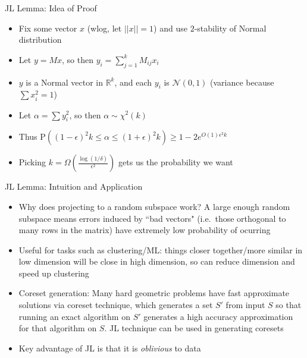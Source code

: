 \begin{frame}{JL Lemma: Idea of Proof}
\protect\hypertarget{jl-lemma-idea-of-proof}{}
\begin{itemize}
\tightlist
\item
  Fix some vector \(x\) (wlog, let \(||x||=1\)) and use \(2\)-stability
  of Normal distribution
\item
  Let \(y = Mx\), so then \(y_i = \sum_{j=1}^k M_{ij} x_{i}\)
\item
  \(y\) is a Normal vector in \(\mathbb{R}^k\), and each \(y_i\) is
  \(\mathcal{N}(0,1)\) (variance because \(\sum x_i^2 = 1\))
\item
  Let \(\alpha = \sum y_i^2\), so then \(\alpha \sim \chi^2 (k)\)
\item
  Thus
  \(\text{P}((1-\epsilon)^2 k \leq \alpha \leq (1+\epsilon)^2 k) \geq 1 - 2e^{O(1)\epsilon^2 k}\)
\item
  Picking \(k = \Omega\left(\frac{\log(1/\delta)}{\epsilon^2}\right)\)
  gets us the probability we want
\end{itemize}
\end{frame}

\begin{frame}{JL Lemma: Intuition and Application}
\protect\hypertarget{jl-lemma-intuition-and-application}{}
\begin{itemize}
\tightlist
\item
  Why does projecting to a random subspace work? A large enough random
  subspace means errors induced by ``bad vectors" (i.e.~those orthogonal
  to many rows in the matrix) have extremely low probability of ocurring
\item
  Useful for tasks such as clustering/ML: things closer together/more
  similar in low dimension will be close in high dimension, so can
  reduce dimension and speed up clustering
\item
  Coreset generation: Many hard geometric problems have fast approximate
  solutions via coreset technique, which generates a set \(S'\) from
  input \(S\) so that running an exact algorithm on \(S'\) generates a
  high accuracy approximation for that algorithm on \(S\). JL technique
  can be used in generating coresets
\item
  Key advantage of JL is that it is \textit{oblivious} to data
\end{itemize}
\end{frame}

